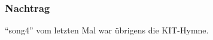\documentclass{beamer}
\date{2017-01-23/24}
\begin{document}
\normalsize
\normalem

\begin{frame}[plain]
  \titlepage
\end{frame}

\begin{frame}
  \frametitle{Nachtrag}
  “song4” vom letzten Mal war übrigens die KIT-Hymne.
\end{frame}
\end{document}
